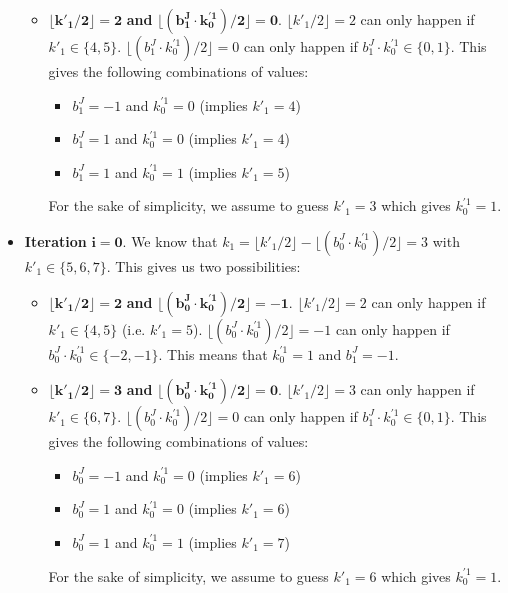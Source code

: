 \begin{itemize}
\begin{itemize}
		\item $\bm { \lfloor k'_1 / 2 \rfloor = 2 }$ \textbf{and} $ \bm{ \lfloor (b_1^J \cdot k_0^{\prime 1}) / 2 \rfloor = 0 }$.
		$\lfloor k'_1 / 2 \rfloor = 2$ can only happen if $k'_1 \in \{4, 5\}$. $ \lfloor (b_1^J \cdot k_0^{\prime 1}) / 2 \rfloor = 0$ can only happen if $b_1^J \cdot k_0^{\prime 1} \in \{0, 1\}$. 
		This gives the following combinations of values:
		\begin{itemize}
			\item $b_1^J = -1$ and $ k_0^{\prime 1} = 0$ (implies $k'_1 = 4$)
			\item $b_1^J = 1$ and $ k_0^{\prime 1} = 0$ (implies $k'_1 = 4$)
			\item $b_1^J = 1$ and $ k_0^{\prime 1} = 1$ (implies $k'_1 = 5$)
		\end{itemize}
		For the sake of simplicity, we assume to guess $k'_1 = 3$ which gives $k_0^{\prime 1} = 1$.
	\end{itemize}
	\item \textbf{Iteration} $\bm{i = 0}$. We know that $k_1 = \lfloor k'_1 / 2 \rfloor - \lfloor (b_0^J \cdot k_0^{\prime 1}) / 2 \rfloor = 3$ with $k'_1 \in \{5, 6, 7\}$. This gives us two possibilities:
	\begin{itemize}
		\item $\bm{ \lfloor k'_1 / 2 \rfloor = 2 }$ \textbf{and} $ \bm{ \lfloor (b_0^J \cdot k_0^{\prime 1}) / 2 \rfloor = -1 }$. 
		$\lfloor k'_1 / 2 \rfloor = 2 $ can only happen if $k'_1 \in \{4, 5\}$ (i.e. $k'_1 = 5$). $\lfloor (b_0^J \cdot k_0^{\prime 1}) / 2 \rfloor = -1$ can only happen if $b_0^J \cdot k_0^{\prime 1} \in \{-2, -1\}$. This means that $k_0^{\prime 1} = 1$ and $b_1^J = -1$.
		
		\item $\bm { \lfloor k'_1 / 2 \rfloor = 3 }$ \textbf{and} $ \bm{ \lfloor (b_0^J \cdot k_0^{\prime 1}) / 2 \rfloor = 0 }$.
		$\lfloor k'_1 / 2 \rfloor = 3$ can only happen if $k'_1 \in \{6, 7\}$. $\lfloor (b_0^J \cdot k_0^{\prime 1}) / 2 \rfloor = 0$ can only happen if $b_1^J \cdot k_0^{\prime 1} \in \{0, 1\}$. 
		This gives the following combinations of values:
		\begin{itemize}
			\item $b_0^J = -1$ and $ k_0^{\prime 1} = 0$ (implies $k'_1 = 6$)
			\item $b_0^J = 1$ and $ k_0^{\prime 1} = 0$ (implies $k'_1 = 6$)
			\item $b_0^J = 1$ and $ k_0^{\prime 1} = 1$ (implies $k'_1 = 7$)
		\end{itemize}
		For the sake of simplicity, we assume to guess $k'_1 = 6$ which gives $k_0^{\prime 1} = 1$.
	\end{itemize}
\end{itemize}
